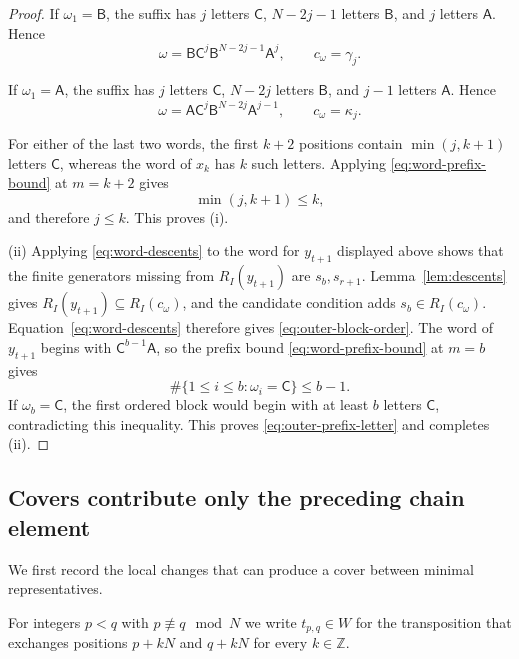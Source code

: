 \documentclass[11pt,a4paper,reqno]{amsart}
\numberwithin{equation}{section}
\theoremstyle{definition}
\theoremstyle{remark}
\theoremstyle{plain}
\newcommand{\Z}{\mathbb Z}
\newcommand{\A}{\mathsf A}
\newcommand{\B}{\mathsf B}
\newcommand{\CC}{\mathsf C}
\begin{document}
\begin{proof}
If $\omega_1=\B$, the suffix has $j$ letters $\CC$,
$N-2j-1$ letters $\B$, and $j$ letters $\A$. Hence
\[
 \omega=\B\CC^j\B^{N-2j-1}\A^j,\qquad c_\omega=\gamma_j.
\]

If $\omega_1=\A$, the suffix has $j$ letters $\CC$,
$N-2j$ letters $\B$, and $j-1$ letters $\A$. Hence
\[
 \omega=\A\CC^j\B^{N-2j}\A^{j-1},\qquad c_\omega=\kappa_j.
\]

For either of the last two words, the first $k+2$ positions contain
$\min(j,k+1)$ letters $\CC$, whereas the word of $x_k$ has $k$
such letters. Applying \eqref{eq:word-prefix-bound} at $m=k+2$ gives
\[
 \min(j,k+1)\leq k,
\]
and therefore $j\leq k$.
This proves \textup{(i)}.

\smallskip\noindent
\textup{(ii)} Applying \eqref{eq:word-descents} to the word for
$y_{t+1}$ displayed above shows that the finite generators missing
from $R_I(y_{t+1})$ are $s_b,s_{r+1}$. Lemma~\ref{lem:descents} gives
$R_I(y_{t+1})\subseteq R_I(c_\omega)$, and the candidate condition
adds $s_b\in R_I(c_\omega)$.
Equation~\eqref{eq:word-descents} therefore gives
\eqref{eq:outer-block-order}.
The word of $y_{t+1}$ begins with $\CC^{b-1}\A$, so the prefix
bound \eqref{eq:word-prefix-bound} at $m=b$ gives
\[
 \#\{1\leq i\leq b:\omega_i=\CC\}\leq b-1.
\]
If $\omega_b=\CC$, the first ordered block would begin with at
least $b$ letters $\CC$, contradicting this inequality.
This proves \eqref{eq:outer-prefix-letter} and completes
\textup{(ii)}.
\end{proof}

\subsection{Covers contribute only the preceding chain element}
We first record the local changes that can produce a cover between
minimal representatives. 

For integers $p<q$ with $p\not \equiv q \mod N$ we write $t_{p,q}\in W$ for the transposition that exchanges positions $p+kN$ and $q+kN$ for every $k \in \Z$. 
\end{document}
